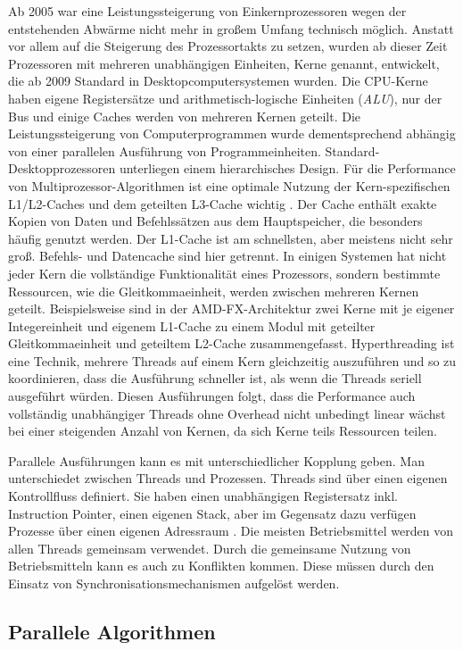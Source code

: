 \documentclass[a4paper,12pt,twoside]{article}
\newcommand{\Fb}[1]{\textit{#1}} %
\begin{document}
Ab 2005 war eine Leistungssteigerung von Einkernprozessoren wegen der entstehenden Abwärme nicht mehr in großem Umfang technisch möglich. Anstatt vor allem auf die Steigerung des Prozessortakts zu setzen, wurden ab dieser Zeit Prozessoren mit mehreren unabhängigen Einheiten, Kerne genannt, entwickelt, die ab 2009 Standard in Desktopcomputersystemen wurden. Die CPU-Kerne haben eigene Registersätze und arithmetisch-logische Einheiten (\Fb{ALU}), nur der Bus und einige Caches werden von mehreren Kernen geteilt. Die Leistungssteigerung von Computerprogrammen wurde dementsprechend abhängig von einer parallelen Ausführung von Programmeinheiten. Standard-Desktopprozessoren unterliegen einem hierarchisches Design. Für die Performance von Multiprozessor-Algorithmen ist eine optimale Nutzung der Kern-spezifischen L1/L2-Caches und dem geteilten L3-Cache wichtig \parencite{Rauber2013}. Der Cache enthält exakte Kopien von Daten und Befehlssätzen aus dem Hauptspeicher, die besonders häufig genutzt werden. Der L1-Cache ist am schnellsten, aber meistens nicht sehr groß. Befehls- und Datencache sind hier getrennt. In einigen Systemen hat nicht jeder Kern die vollständige Funktionalität eines Prozessors, sondern bestimmte Ressourcen, wie die Gleitkommaeinheit, werden zwischen mehreren Kernen geteilt. Beispielsweise sind in der AMD-FX-Architektur zwei Kerne mit je eigener Integereinheit und eigenem L1-Cache zu einem Modul mit geteilter Gleitkommaeinheit und geteiltem L2-Cache zusammengefasst. Hyperthreading ist eine Technik, mehrere Threads auf einem Kern gleichzeitig auszuführen und so zu koordinieren, dass die Ausführung schneller ist, als wenn die Threads seriell ausgeführt würden. Diesen Ausführungen folgt, dass die Performance auch vollständig unabhängiger Threads ohne Overhead nicht unbedingt linear wächst bei einer steigenden Anzahl von Kernen, da sich Kerne teils Ressourcen teilen.

Parallele Ausführungen kann es mit unterschiedlicher Kopplung geben. Man unterschiedet zwischen Threads und Prozessen. Threads sind über einen eigenen Kontrollfluss definiert. Sie haben einen unabhängigen Registersatz inkl. Instruction Pointer, einen eigenen Stack, aber im Gegensatz dazu verfügen Prozesse über einen eigenen Adressraum \parencite[S. 95]{Rauber2013}. Die meisten Betriebsmittel werden von allen Threads gemeinsam verwendet. Durch die gemeinsame Nutzung von Betriebsmitteln kann es auch zu Konflikten kommen. Diese müssen durch den Einsatz von Synchronisationsmechanismen aufgelöst werden.

\subsection{Parallele Algorithmen}
\end{document}
